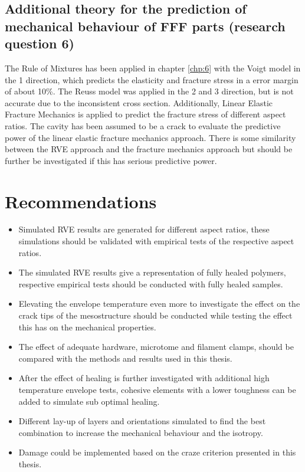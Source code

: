 \subsection{Additional theory for the prediction of mechanical behaviour of FFF parts (research question 6)}
The Rule of Mixtures has been applied in chapter \ref{chp:6} with the Voigt model in the 1 direction, which predicts the elasticity and fracture stress in a error margin of about 10\%. The Reuss model was applied in the 2 and 3 direction, but is not accurate due to the inconsistent cross section.
Additionally, Linear Elastic Fracture Mechanics is applied to predict the fracture stress of different aspect ratios. The cavity has been assumed to be a crack to evaluate the predictive power of the linear elastic fracture mechanics approach. There is some similarity between the RVE approach and the fracture mechanics approach but should be further be investigated if this has serious predictive power.

\section{Recommendations}
\begin{itemize}
  \item Simulated RVE results are generated for different aspect ratios, these simulations should be validated with empirical tests of the respective aspect ratios.

  \item The simulated RVE results give a representation of fully healed polymers, respective empirical tests should be conducted with fully healed samples.
  
  \item Elevating the envelope temperature even more to investigate the effect on the crack tips of the mesostructure should be conducted while testing the effect this has on the mechanical properties.
  
  \item The effect of adequate hardware, microtome and filament clamps, should be compared with the methods and results used in this thesis.
  
  \item After the effect of healing is further investigated with additional high temperature envelope tests, cohesive elements with a lower toughness can be added to simulate sub optimal healing.
  
  \item Different lay-up of layers and orientations simulated to find the best combination to increase the mechanical behaviour and the isotropy. 
  
  \item Damage could be implemented based on the craze criterion presented in this thesis. 
  

\end{itemize}

